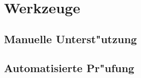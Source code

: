 %



\section{Werkzeuge}
\label{Abschnitt:Programmfehler:Werkzeuge}







\subsection{Manuelle Unterst{"u}tzung}
\label{Abschnitt:Programmfehler:Werkzeuge:Manuell}






\subsection{Automatisierte Pr{"u}fung}
\label{Abschnitt:Programmfehler:Werkzeuge:Automatisiert}








